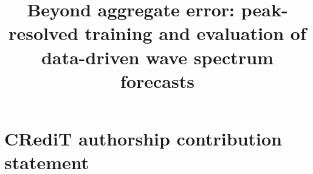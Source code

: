 \documentclass[preprint,12pt,authoryear]{elsarticle}
\begin{document}
\begin{frontmatter}

\title{Beyond aggregate error: peak-resolved training and evaluation of data-driven wave spectrum forecasts
}

\author{%
}


\begin{abstract}
\end{abstract}

\begin{highlights}
\item %
\item %
\item %
\end{highlights}

\begin{keyword}
\end{keyword}

\end{frontmatter}








\section*{CRediT authorship contribution statement}
\end{document}
